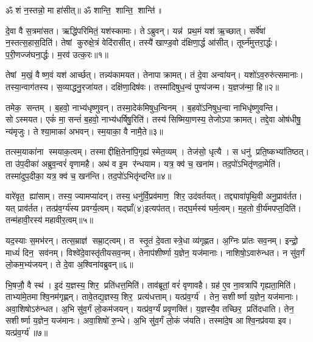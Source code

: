 \setcounter{anuvakam}{0}

ॐ शं न॒स्तन्नो॒ मा हा॑सीत्॥ ॐ शान्ति॒ शान्ति॒ शान्ति॑॥

दे॒वा वै स॒त्रमा॑सत। ऋद्धि॑परिमितं॒ यश॑स्कामाः। तेऽब्रुवन्। यन्न॑ प्रथ॒मं यश॑ ऋ॒च्छात्। सर्वे॑षां न॒स्तत्स॒हास॒दिति॑। तेषां कुरुक्षे॒त्रं वेदि॑रासीत्। तस्यै॑ खाण्ड॒वो द॑क्षिणा॒र्द्ध आ॑सीत्। तूर्घ्न॑मुत्तरा॒र्द्धः। प॒री॒णज्ज॑घना॒र्द्धः। म॒रव॑ उत्क॒रः॥१॥

तेषां म॒खं॒ वैष्ण॒वं यश॑ आर्च्छत्। तन्न्य॑कामयत। तेनापाक्रामत्। तं दे॒वा अन्वा॑यन्। यशो॑ऽव॒रुरु॑त्समानाः। तस्या॒न्वाग॑तस्य। स॒व्याद्धनु॒रजा॑यत। दक्षि॑णा॒दिष॑वः। तस्मा॑दिषुध॒न्वं पुण्य॑जन्म। य॒ज्ञज॑न्मा॒ हि॥२॥

तमेक॒ सन्तम्। ब॒हवो॒ नाभ्य॑धृष्णुवन्। तस्मा॒देक॑मिषुध॒न्वि\-नम्। ब॒हवो॑ऽनिषुध॒न्वा नाभिधृ॑ष्णुवन्ति। सोऽस्मयत। एकं॑ मा॒ सन्तं॑ ब॒हवो॒ नाभ्य॑धर्\mbox{}षिषु॒रिति॑। तस्य॑ सिष्मिया॒णस्य॒ तेजोऽपाक्रामत्। तद्दे॒वा ओष॑धीषु॒ न्य॑मृजुः। ते श्या॒माका॑ अभवन्। स्म॒याका॒ वै नामै॒ते॥३॥

तत्स्म॒याका॑ना स्मयाक॒त्वम्। तस्माद्दीक्षि॒तेना॑पि॒गृह्य॑ स्मेत॒व्यम्। तेज॑सो॒ धृत्यै। स धनु॑ प्रति॒ष्कभ्या॑तिष्ठत्। ता उ॑प॒दीका॑ अब्रुव॒न्वरं॑ वृणामहै। अथ॑ व इ॒म र॑न्धयाम। यत्र॒ क्व॑ च॒ खना॑म। तद॒पो॑ऽभितृ॑णदा॒मेति॑। तस्मा॑दुप॒दीका॒ यत्र॒ क्व॑ च॒ खन॑न्ति। तद॒पो॑ऽभितृ॑न्दन्ति॥४॥

वारे॑वृत॒ ह्या॑साम्। तस्य॒ ज्यामप्या॑दन्। तस्य॒ धनु॑र्वि॒प्रव॑माण॒ शिर॒ उद॑वर्तयत्। तद्द्यावा॑पृथि॒वी अनु॒प्राव॑र्तत। यत् प्राव॑र्तत। तत्प्र॑व॒र्ग्य॑स्य प्रवर्ग्य॒त्वम्। यद्घ्राँ(४)इत्यप॑तत्। तद्\mbox{}घ॒र्मस्य॑ घर्म॒त्वम्। म॒ह॒तो वी॒र्य॑मपप्त॒दिति॑। तन्म॑हावी॒रस्य॑ महावीर॒त्वम्॥५॥

यद॒स्याः स॒मभ॑रन्। तत्स॒म्राज्ञ॑ सम्रा॒ट्त्वम्। त स्तृ॒तं दे॒वतास्त्रे॒धा व्य॑गृह्णत। अ॒ग्निः प्रा॑तः सव॒नम्। इन्द्रो॒ माध्यं॑ दिन॒ सव॑नम्। विश्वे॑दे॒वास्तृ॑तीयसव॒नम्। तेनाप॑शीर्ष्णा य॒ज्ञेन॒ यज॑मानाः। नाशिषो॒ऽवारु॑न्धत। न सु॑व॒र्गं लो॒कम॒भ्य॑जयन्। ते दे॒वा अ॒श्विना॑वब्रुवन्॥६॥

भि॒षजौ॒ वै स्थ॑। इ॒दं य॒ज्ञस्य॒ शिर॒ प्रति॑धत्त॒मिति॑। ताव॑ब्रूतां॒ वरं॑ वृणावहै। ग्रह॑ ए॒व ना॒वत्रापि॑ गृह्यता॒मिति॑। ताभ्या॑मे॒तमाश्वि॒नम॑गृह्णन्। तावे॒तद्य॒ज्ञस्य॒ शिर॒ प्रत्य॑धत्ताम्। यत्प्र॑व॒र्ग्य॑। तेन॒ सशीर्ष्णा य॒ज्ञेन॒ यज॑मानाः। अवा॒शिषो\-ऽरु॑न्धत। अ॒भि सु॑व॒र्गं लो॒कम॑जयन्। यत्प्र॑व॒र्ग्यं॑ प्रवृ॒णक्ति॑। य॒ज्ञस्यै॒व तच्छिर॒ प्रति॑दधाति। तेन॒ सशीर्ष्णा य॒ज्ञेन॒ यज॑मानः। अवा॒शिषो॑ रु॒न्धे। अ॒भि सु॑व॒र्गं लो॒कं ज॑यति। तस्मा॑दे॒ष आश्वि॒नप्र॑वया इव। यत्प्र॑व॒र्ग्य॑॥७॥
\anuvakamend[उ॒त्क॒रो ह्ये॑ते तृ॑न्दन्ति महावीर॒त्वम॑ब्रुवन्नजयन्त्स॒प्त च॑]

